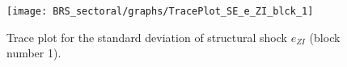 \begin{figure}[H]
\centering
  \texttt{[image: BRS\_sectoral/graphs/TracePlot\_SE\_e\_ZI\_blck\_1]}\\
    \caption{Trace plot for the standard deviation of structural shock ${e_{ZI}}$ (block number 1).}
\end{figure}
